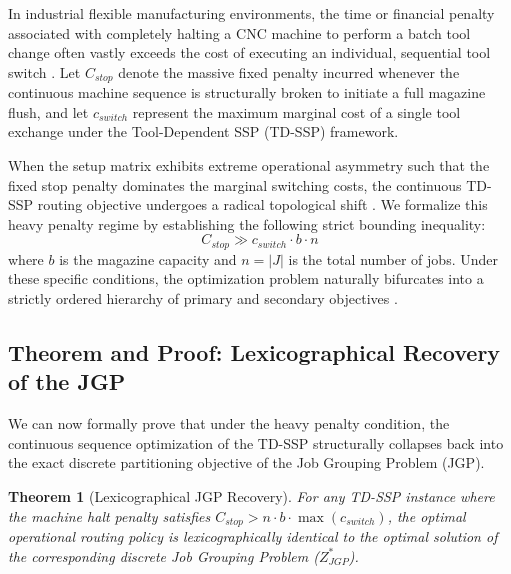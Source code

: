 \documentclass[11pt, a4paper]{book}
\newtheorem{theorem}{Theorem}[chapter]
\begin{document}
	In industrial flexible manufacturing environments, the time or financial penalty associated with completely halting a CNC machine to perform a batch tool change often vastly exceeds the cost of executing an individual, sequential tool switch %
	. Let $C_{stop}$ denote the massive fixed penalty incurred whenever the continuous machine sequence is structurally broken to initiate a full magazine flush, and let $c_{switch}$ represent the maximum marginal cost of a single tool exchange under the Tool-Dependent SSP (TD-SSP) framework.
	
	When the setup matrix exhibits extreme operational asymmetry such that the fixed stop penalty dominates the marginal switching costs, the continuous TD-SSP routing objective undergoes a radical topological shift %
	. We formalize this heavy penalty regime by establishing the following strict bounding inequality:
	\begin{equation}
		C_{stop} \gg c_{switch} \cdot b \cdot n
	\end{equation}
	where $b$ is the magazine capacity and $n = |J|$ is the total number of jobs. Under these specific conditions, the optimization problem naturally bifurcates into a strictly ordered hierarchy of primary and secondary objectives %
	.
	
	\subsection{Theorem and Proof: Lexicographical Recovery of the JGP}
	
	We can now formally prove that under the heavy penalty condition, the continuous sequence optimization of the TD-SSP structurally collapses back into the exact discrete partitioning objective of the Job Grouping Problem (JGP).
	
	\begin{theorem}[Lexicographical JGP Recovery]
		For any TD-SSP instance where the machine halt penalty satisfies $C_{stop} > n \cdot b \cdot \max(c_{switch})$, the optimal operational routing policy is lexicographically identical to the optimal solution of the corresponding discrete Job Grouping Problem ($Z_{JGP}^*$).
	\end{theorem}
	
\end{document}
